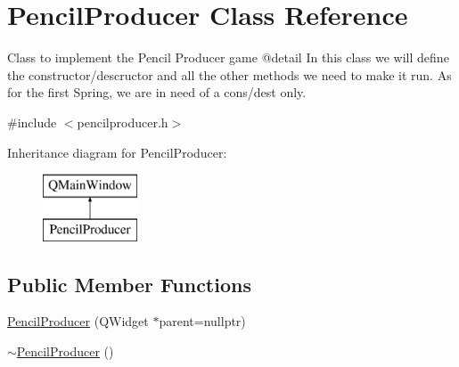 \hypertarget{classPencilProducer}{}\section{Pencil\+Producer Class Reference}
\label{classPencilProducer}


Class to implement the Pencil Producer game @detail In this class we will define the constructor/descructor and all the other methods we need to make it run. As for the first Spring, we are in need of a cons/dest only.  




{\ttfamily \#include $<$pencilproducer.\+h$>$}

Inheritance diagram for Pencil\+Producer\+:\begin{figure}[H]
\begin{center}
\leavevmode
\includegraphics[height=2.000000cm]{classPencilProducer}
\end{center}
\end{figure}
\subsection*{Public Member Functions}
\begin{DoxyCompactItemize}
\item 
\mbox{\hyperlink{classPencilProducer_a7b5425cd4bfd41d7b9cc9fe04101df06}{Pencil\+Producer}} (Q\+Widget $\ast$parent=nullptr)
\item 
\mbox{\hyperlink{classPencilProducer_a6e4548750600eb7b6886538a23ba4808}{$\sim$\+Pencil\+Producer}} ()
\end{DoxyCompactItemize}
